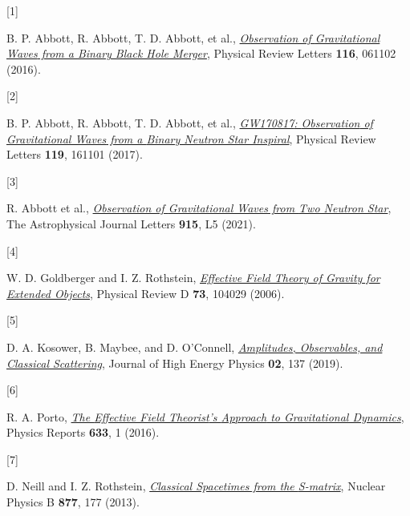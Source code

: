 \documentclass[
  10pt,
  a4paper,
  DIV=11,
  numbers=noendperiod,
  twoside]{scrreprt}
\newlength{\cslhangindent}
\newlength{\csllabelwidth}
\newlength{\cslentryspacingunit} %
\newenvironment{CSLReferences}[2] %
 {%
  \setlength{\parindent}{0pt}
  \ifodd #1
  \let\oldpar\par
  \def\par{\hangindent=\cslhangindent\oldpar}
  \fi
  \setlength{\parskip}{#2\cslentryspacingunit}
 }%
 {}
\newcommand{\CSLLeftMargin}[1]{\parbox[t]{\csllabelwidth}{#1}}
\newcommand{\CSLRightInline}[1]{\parbox[t]{\linewidth - \csllabelwidth}{#1}\break}
\DeclareRobustCommand{\[}{\begin{equation}}
\DeclareRobustCommand{\]}{\end{equation}}
\begin{document}
\hypertarget{refs}{}
\begin{CSLReferences}{0}{0}
\begin{figure}

\end{figure}

\leavevmode{}%
\CSLLeftMargin{{[}1{]} }%
\CSLRightInline{B. P. Abbott, R. Abbott, T. D. Abbott, et al.,
\emph{\href{https://doi.org/10.1103/PhysRevLett.116.061102}{Observation
of {Gravitational Waves} from a {Binary Black Hole Merger}}}, Physical
Review Letters \textbf{116}, 061102 (2016).}

\leavevmode{}%
\CSLLeftMargin{{[}2{]} }%
\CSLRightInline{B. P. Abbott, R. Abbott, T. D. Abbott, et al.,
\emph{\href{https://doi.org/10.1103/PhysRevLett.119.161101}{{GW170817}:
{Observation} of {Gravitational Waves} from a {Binary Neutron Star
Inspiral}}}, Physical Review Letters \textbf{119}, 161101 (2017).}

\leavevmode{}%
\CSLLeftMargin{{[}3{]} }%
\CSLRightInline{R. Abbott et al.,
\emph{\href{https://doi.org/10.3847/2041-8213/ac082e}{Observation of
{Gravitational Waves} from {Two Neutron
Star}\textendash{{Black Hole Coalescences}}}}, The Astrophysical Journal
Letters \textbf{915}, L5 (2021).}

\leavevmode{}%
\CSLLeftMargin{{[}4{]} }%
\CSLRightInline{W. D. Goldberger and I. Z. Rothstein,
\emph{\href{https://doi.org/10.1103/PhysRevD.73.104029}{Effective Field
Theory of Gravity for Extended Objects}}, Physical Review D \textbf{73},
104029 (2006).}

\leavevmode{}%
\CSLLeftMargin{{[}5{]} }%
\CSLRightInline{D. A. Kosower, B. Maybee, and D. O'Connell,
\emph{\href{https://doi.org/10.1007/JHEP02(2019)137}{Amplitudes,
Observables, and Classical Scattering}}, Journal of High Energy Physics
\textbf{02}, 137 (2019).}

\leavevmode{}%
\CSLLeftMargin{{[}6{]} }%
\CSLRightInline{R. A. Porto,
\emph{\href{https://doi.org/10.1016/j.physrep.2016.04.003}{The
{Effective Field Theorist}'s {Approach} to {Gravitational Dynamics}}},
Physics Reports \textbf{633}, 1 (2016).}

\leavevmode{}%
\CSLLeftMargin{{[}7{]} }%
\CSLRightInline{D. Neill and I. Z. Rothstein,
\emph{\href{https://doi.org/10.1016/j.nuclphysb.2013.09.007}{Classical
Space\textendash times from the {S-matrix}}}, Nuclear Physics B
\textbf{877}, 177 (2013).}


\end{CSLReferences}
\end{document}
